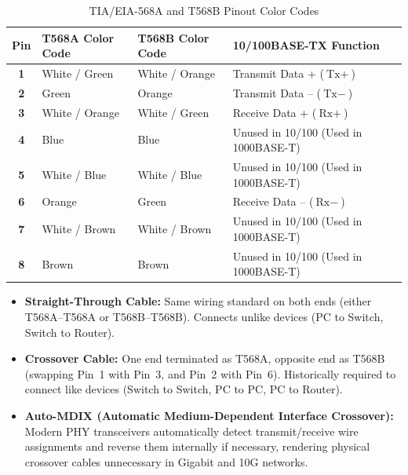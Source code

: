 \begin{table}[H]
\centering
\small
{}
\begin{tabularx}{\linewidth}{c l l l}
\toprule
\rowcolor{tableheadercolor}
\textbf{Pin} & \textbf{T568A Color Code} & \textbf{T568B Color Code} & \textbf{10/100BASE-TX Function} \\
\midrule
\textbf{1} & White / Green & White / Orange & Transmit Data + ($\text{Tx}+$) \\
\textbf{2} & Green & Orange & Transmit Data -- ($\text{Tx}-$) \\
\textbf{3} & White / Orange & White / Green & Receive Data + ($\text{Rx}+$) \\
\textbf{4} & Blue & Blue & Unused in 10/100 (Used in 1000BASE-T) \\
\textbf{5} & White / Blue & White / Blue & Unused in 10/100 (Used in 1000BASE-T) \\
\textbf{6} & Orange & Green & Receive Data -- ($\text{Rx}-$) \\
\textbf{7} & White / Brown & White / Brown & Unused in 10/100 (Used in 1000BASE-T) \\
\textbf{8} & Brown & Brown & Unused in 10/100 (Used in 1000BASE-T) \\
\bottomrule
\end{tabularx}
\caption{TIA/EIA-568A and T568B Pinout Color Codes}
\end{table}

\begin{notebox}
\begin{itemize}[leftmargin=*]
    \item \textbf{Straight-Through Cable:} Same wiring standard on both ends (either T568A--T568A or T568B--T568B). Connects unlike devices (PC to Switch, Switch to Router).
    \item \textbf{Crossover Cable:} One end terminated as T568A, opposite end as T568B (swapping Pin~1 with Pin~3, and Pin~2 with Pin~6). Historically required to connect like devices (Switch to Switch, PC to PC, PC to Router).
    \item \textbf{Auto-MDIX (Automatic Medium-Dependent Interface Crossover):} Modern PHY transceivers automatically detect transmit/receive wire assignments and reverse them internally if necessary, rendering physical crossover cables unnecessary in Gigabit and 10G networks.
\end{itemize}
\end{notebox}

